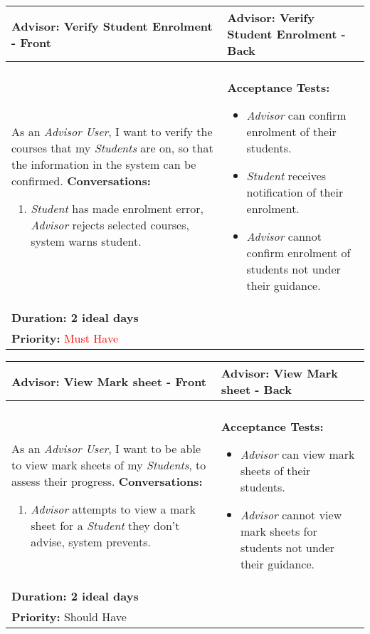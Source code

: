 \documentclass[11pt]{article}
\begin{document}
\begin{center}
\begin{tabular}{ | m{8cm}  |  m{8cm}  | } 
 \hline
 \textbf{Advisor: Verify Student Enrolment - Front} &  \textbf{Advisor: Verify Student Enrolment - Back}  \\ 
  \hline
&\\[5pt]
As an \emph{Advisor User}, I want to verify the courses that my \emph{Students} are on, so that the information in the system can be confirmed.
\newline
\textbf{Conversations:}
\begin{enumerate}
\item{\emph{Student} has made enrolment error, \emph{Advisor} rejects selected courses, system warns student.}
\end{enumerate}
& \textbf{Acceptance Tests:} 
\begin{itemize}
\item{\emph{Advisor} can confirm enrolment of their students.}
\item{\emph{Student} receives notification of their enrolment.}
\item{\emph{Advisor} cannot confirm enrolment of students not under their guidance.} 
\end{itemize} \\
\textbf{Duration: 2 ideal days} &\\
\textbf{Priority:}  \textcolor{red}{Must Have} & \\
 \hline
\end{tabular}
\end{center}

\begin{center}
\begin{tabular}{ | m{8cm}  |  m{8cm}  | } 
 \hline
 \textbf{Advisor: View Mark sheet - Front} &  \textbf{Advisor: View Mark sheet  - Back}  \\ 
  \hline
&\\[5pt]
As an \emph{Advisor User}, I want to be able to view mark sheets of my \emph{Students}, to assess their progress.
\newline
\textbf{Conversations:}
\begin{enumerate}
\item{\emph{Advisor} attempts to view a mark sheet for a \emph{Student} they don't advise, system prevents.}
\end{enumerate}
& \textbf{Acceptance Tests:} 
\begin{itemize}
\item{\emph{Advisor} can view mark sheets of their students.}
\item{\emph{Advisor} cannot view mark sheets for students not under their guidance.} 
\end{itemize} \\
\textbf{Duration: 2 ideal days} &\\
\textbf{Priority:}  \textcolor{mauve}{Should Have} & \\
 \hline
\end{tabular}
\end{center}
\end{document}
